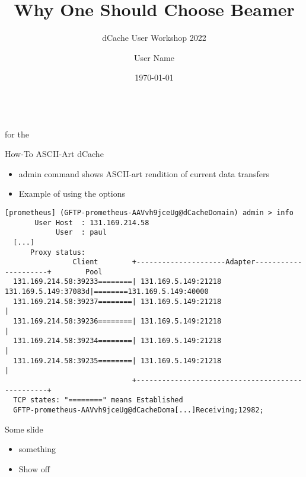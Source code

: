 \documentclass[english, presentation, aspectratio=169, 14pt]{beamer} %
\title{Why One Should Choose Beamer}
\subtitle{dCache User Workshop 2022}
\author{User Name}
\institute{dCache Collaboration}
\date{\today}
\begin{document}
	{ %
		
	\begin{frame}
		\centering
		\vspace{30mm}
		
		\MainTitle{\inserttitle}\\
		\vspace{4mm}
		\MainSubTitle{\insertsubtitle}
		{\insertauthor} for the \insertinstitute
		
		\vfill
		\vspace{4mm}
		\flushright
		\LogoGroup
	\end{frame}
	}

	\begin{frame}[fragile]{How-To ASCII-Art dCache}
		\begin{itemize}
			\item {} admin command shows ASCII-art rendition of current data transfers
			\item Example of  using the options \Code{-no-g2 -p 5}
		\end{itemize}\color{darkgray}
\begin{lstlisting}[basicstyle=\tiny]
  [prometheus] (GFTP-prometheus-AAVvh9jceUg@dCacheDomain) admin > info
       User Host  : 131.169.214.58
            User  : paul
  [...]
      Proxy status:
                Client        +---------------------Adapter---------------------+        Pool
  131.169.214.58:39233========| 131.169.5.149:21218         131.169.5.149:37083d|========131.169.5.149:40000
  131.169.214.58:39237========| 131.169.5.149:21218                             |
  131.169.214.58:39236========| 131.169.5.149:21218                             |
  131.169.214.58:39234========| 131.169.5.149:21218                             |
  131.169.214.58:39235========| 131.169.5.149:21218                             |
                              +-------------------------------------------------+
  TCP states: "========" means Established
  GFTP-prometheus-AAVvh9jceUg@dCacheDoma[...]Receiving;12982;
\end{lstlisting}
	\end{frame}

	\begin{frame}{Some slide}
		\begin{itemize}
			\item {} something
			\item Show off \Code{code examples}
		\end{itemize}
	\end{frame}
\end{document}

